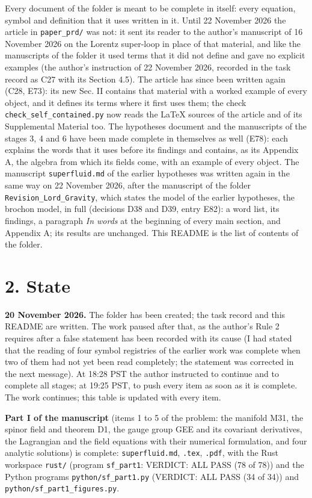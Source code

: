 \documentclass[
  10pt,
]{article}
\begin{document}
Every document of the folder is meant to be complete in itself: every
equation, symbol and definition that it uses written in it. Until 22
November 2026 the article in \texttt{paper\_prd/} was not: it sent its
reader to the author's manuscript of 16 November 2026 on the Lorentz
super-loop in place of that material, and like the manuscripts of the
folder it used terms that it did not define and gave no explicit
examples (the author's instruction of 22 November 2026, recorded in the
task record as C27 with its Section 4.5). The article has since been
written again (C28, E73): its new Sec. II contains that material with a
worked example of every object, and it defines its terms where it first
uses them; the check \texttt{check\_self\_contained.py} now reads the
LaTeX sources of the article and of its Supplemental Material too. The
hypotheses document and the manuscripts of the stages 3, 4 and 6 have
been made complete in themselves as well (E78): each explains the words
that it uses before its findings and contains, as its Appendix A, the
algebra from which its fields come, with an example of every object. The
manuscript \texttt{superfluid.md} of the earlier hypotheses was written
again in the same way on 22 November 2026, after the manuscript of the
folder \texttt{Revision\_Lord\_Gravity}, which states the model of the
earlier hypotheses, the brochon model, in full (decisions D38 and D39,
entry E82): a word list, its findings, a paragraph \emph{In words} at
the beginning of every main section, and Appendix A; its results are
unchanged. This README is the list of contents of the folder.

\hypertarget{state}{%
\section{2. State}\label{state}}

\textbf{20 November 2026.} The folder has been created; the task record
and this README are written. The work paused after that, as the author's
Rule 2 requires after a false statement has been recorded with its cause
(I had stated that the reading of four symbol registries of the earlier
work was complete when two of them had not yet been read completely; the
statement was corrected in the next message). At 18:28 PST the author
instructed to continue and to complete all stages; at 19:25 PST, to push
every item as soon as it is complete. The work continues; this table is
updated with every item.

\textbf{Part I of the manuscript} (items 1 to 5 of the problem: the
manifold M31, the spinor field and theorem D1, the gauge group GEE and
its covariant derivatives, the Lagrangian and the field equations with
their numerical formulation, and four analytic solutions) is complete:
\texttt{superfluid.md}, \texttt{.tex}, \texttt{.pdf}, with the Rust
workspace \texttt{rust/} (program \texttt{sf\_part1}: VERDICT: ALL PASS
(78 of 78)) and the Python programs \texttt{python/sf\_part1.py}
(VERDICT: ALL PASS (34 of 34)) and
\texttt{python/sf\_part1\_figures.py}.
\end{document}
